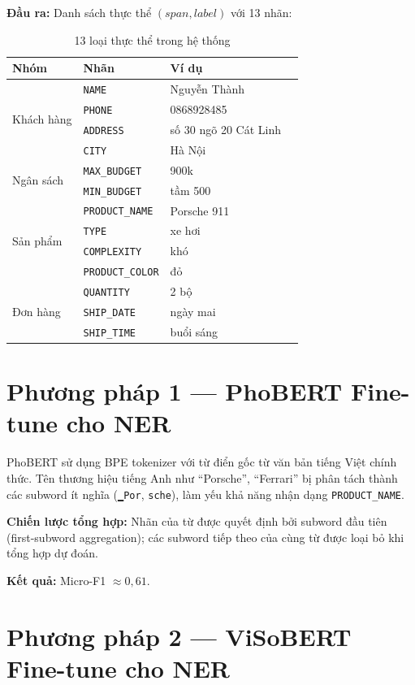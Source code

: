 \documentclass[12pt, a4paper]{report}
\begin{document}
\textbf{Đầu ra:} Danh sách thực thể $(span, label)$ với 13 nhãn:

\begin{table}[H]
\centering
\caption{13 loại thực thể trong hệ thống}
\label{tab:entities}
\begin{tabular}{llll}
\toprule
\textbf{Nhóm} & \textbf{Nhãn} & \textbf{Ví dụ} \\
\midrule
\multirow{4}{*}{Khách hàng}
  & \texttt{NAME}    & Nguyễn Thành \\
  & \texttt{PHONE}   & 0868928485 \\
  & \texttt{ADDRESS} & số 30 ngõ 20 Cát Linh \\
  & \texttt{CITY}    & Hà Nội \\
\midrule
\multirow{2}{*}{Ngân sách}
  & \texttt{MAX\_BUDGET} & 900k \\
  & \texttt{MIN\_BUDGET} & tầm 500 \\
\midrule
\multirow{4}{*}{Sản phẩm}
  & \texttt{PRODUCT\_NAME}  & Porsche 911 \\
  & \texttt{TYPE}           & xe hơi \\
  & \texttt{COMPLEXITY}     & khó \\
  & \texttt{PRODUCT\_COLOR} & đỏ \\
\midrule
\multirow{3}{*}{Đơn hàng}
  & \texttt{QUANTITY}  & 2 bộ \\
  & \texttt{SHIP\_DATE} & ngày mai \\
  & \texttt{SHIP\_TIME} & buổi sáng \\
\bottomrule
\end{tabular}
\end{table}

\section{Phương pháp 1 — PhoBERT Fine-tune cho NER}

PhoBERT sử dụng BPE tokenizer với từ điển gốc từ văn bản tiếng Việt
chính thức. Tên thương hiệu tiếng Anh như ``Porsche'', ``Ferrari''
bị phân tách thành các subword ít nghĩa (\texttt{▁Por}, \texttt{sche}),
làm yếu khả năng nhận dạng \texttt{PRODUCT\_NAME}.

\textbf{Chiến lược tổng hợp:} Nhãn của từ được quyết định bởi subword đầu tiên
(first-subword aggregation); các subword tiếp theo của cùng từ được loại bỏ
khi tổng hợp dự đoán.

\textbf{Kết quả:} Micro-F1 $\approx 0,61$.

\section{Phương pháp 2 — ViSoBERT Fine-tune cho NER}
\end{document}
